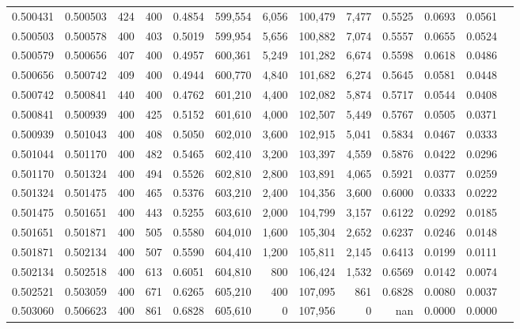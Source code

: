 \begin{tabular}{rrrrrrrrrrrrr}
0.500431 & 0.500503 &    424 & 400 &                                     0.4854 & 599,554 &   6,056 & 100,479 &   7,477 & 0.5525 & 0.0693 & 0.0561 \\
0.500503 & 0.500578 &    400 & 403 &                                     0.5019 & 599,954 &   5,656 & 100,882 &   7,074 & 0.5557 & 0.0655 & 0.0524 \\
0.500579 & 0.500656 &    407 & 400 &                                     0.4957 & 600,361 &   5,249 & 101,282 &   6,674 & 0.5598 & 0.0618 & 0.0486 \\
0.500656 & 0.500742 &    409 & 400 &                                     0.4944 & 600,770 &   4,840 & 101,682 &   6,274 & 0.5645 & 0.0581 & 0.0448 \\
0.500742 & 0.500841 &    440 & 400 &                                     0.4762 & 601,210 &   4,400 & 102,082 &   5,874 & 0.5717 & 0.0544 & 0.0408 \\
0.500841 & 0.500939 &    400 & 425 &                                     0.5152 & 601,610 &   4,000 & 102,507 &   5,449 & 0.5767 & 0.0505 & 0.0371 \\
0.500939 & 0.501043 &    400 & 408 &                                     0.5050 & 602,010 &   3,600 & 102,915 &   5,041 & 0.5834 & 0.0467 & 0.0333 \\
0.501044 & 0.501170 &    400 & 482 &                                     0.5465 & 602,410 &   3,200 & 103,397 &   4,559 & 0.5876 & 0.0422 & 0.0296 \\
0.501170 & 0.501324 &    400 & 494 &                                     0.5526 & 602,810 &   2,800 & 103,891 &   4,065 & 0.5921 & 0.0377 & 0.0259 \\
0.501324 & 0.501475 &    400 & 465 &                                     0.5376 & 603,210 &   2,400 & 104,356 &   3,600 & 0.6000 & 0.0333 & 0.0222 \\
0.501475 & 0.501651 &    400 & 443 &                                     0.5255 & 603,610 &   2,000 & 104,799 &   3,157 & 0.6122 & 0.0292 & 0.0185 \\
0.501651 & 0.501871 &    400 & 505 &                                     0.5580 & 604,010 &   1,600 & 105,304 &   2,652 & 0.6237 & 0.0246 & 0.0148 \\
0.501871 & 0.502134 &    400 & 507 &                                     0.5590 & 604,410 &   1,200 & 105,811 &   2,145 & 0.6413 & 0.0199 & 0.0111 \\
0.502134 & 0.502518 &    400 & 613 &                                     0.6051 & 604,810 &     800 & 106,424 &   1,532 & 0.6569 & 0.0142 & 0.0074 \\
0.502521 & 0.503059 &    400 & 671 &                                     0.6265 & 605,210 &     400 & 107,095 &     861 & 0.6828 & 0.0080 & 0.0037 \\
0.503060 & 0.506623 &    400 & 861 &                                     0.6828 & 605,610 &       0 & 107,956 &       0 &    nan & 0.0000 & 0.0000 \\
\bottomrule
\end{tabular}
